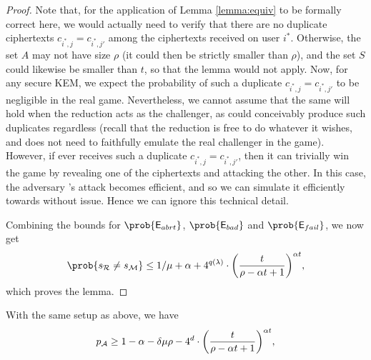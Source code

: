 \begin{proof}
  Note that, for the application of Lemma \ref{lemma:equiv} to be formally correct here,
  we would actually need to verify that there are no duplicate ciphertexts
  \(c_{i^{*},j} = c_{i^{*},j'}\) among the ciphertexts received on user \(i^{*}\).
  Otherwise, the set \(A\) may not have size \(\rho\)
  (it could then be strictly smaller than \(\rho\)),
  and the set \(S\) could likewise be smaller than \(t\),
  so that the lemma would not apply.
  Now, for any secure KEM, we expect the probability of such a
  duplicate \(c_{i^{*},j} = c_{i^{*},j'}\) to be negligible in the real \OWECPA game.
  Nevertheless, we cannot assume that the same will hold
  when the reduction \redR acts as the challenger,
  as \redR could conceivably produce such duplicates regardless
  (recall that the reduction is free to do whatever it wishes, and does not need to
  faithfully emulate the real challenger in the \OWECPA game).
  However, if \advA ever receives such a duplicate \(c_{i^{*},j} = c_{i^{*},j'}\),
  then it can trivially win the \OWECPA game by revealing one of the ciphertexts and attacking the other.
  In this case, the adversary \advA's attack becomes efficient,
  and so we can simulate it efficiently towards \redR without issue.
  Hence we can ignore this technical detail.

  Combining the bounds for \(\prob{\eventE_{abrt}}\), \(\prob{\eventE_{bad}}\) and \(\prob{\eventE_{fail}}\), we now get
  \[
    \prob{s_{\redR} \ne s_{\redM}} \le 1 / \mu + \alpha
    + 4^{q(\lambda)} \cdot \left( \frac{t}{\rho - \alpha t + 1} \right)^{\alpha t},
  \]
  which proves the lemma.
\end{proof}

\begin{lemma}\label{lemma:A}
  With the same setup as above, we have
  \begin{equation}\label{ineq:A:lemma}
    p_{\advA} \ge 1 - \alpha - \delta \mu \rho
    - 4^{d} \cdot \left( \frac{t}{\rho - \alpha t + 1} \right)^{\alpha t},
  \end{equation}
\end{lemma}

